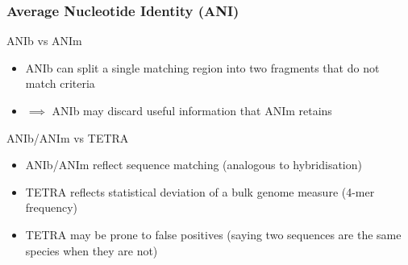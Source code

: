 \begin{frame}
\begin{columns}[T]
\begin{column}{5cm}
    \end{column}
  \end{columns}       
\end{frame}

%
\begin{frame}
  \frametitle{Average Nucleotide Identity (ANI)}
  \textcolor{hutton_green}{ANIb vs ANIm}
  \begin{itemize}
    \item ANIb can split a single matching region into two fragments that do not match criteria
    \item $\implies$ ANIb may discard useful information that ANIm retains
  \end{itemize}
  \textcolor{hutton_blue}{ANIb/ANIm vs TETRA}
  \begin{itemize}
    \item ANIb/ANIm reflect sequence matching (analogous to hybridisation)
    \item TETRA reflects statistical deviation of a bulk genome measure (4-mer frequency)
    \item TETRA may be prone to false positives (saying two sequences are the same species when they are not)
  \end{itemize}  
\end{frame}
